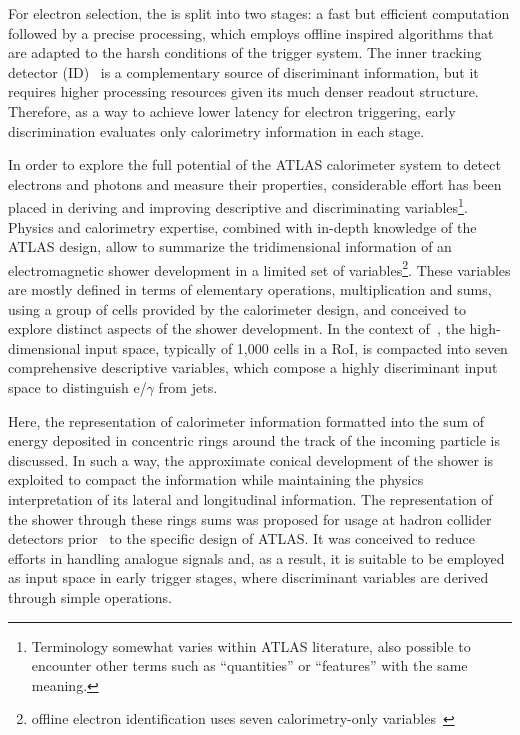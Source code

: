 For electron selection, the \hlt{} is split into two stages: a fast but efficient computation followed by a precise processing, which employs offline inspired algorithms that are adapted to the harsh conditions of the trigger system. The inner tracking detector (ID)~\cite{PERF-2007-01} is a complementary source of discriminant information, but it requires higher processing resources given its much denser readout structure.  Therefore, as a way to achieve lower latency for electron triggering, early discrimination evaluates only calorimetry information in each stage.


In order to explore the full potential of the ATLAS calorimeter system to detect electrons and photons and measure their properties, considerable effort has been placed in deriving and improving descriptive and discriminating variables\footnote{Terminology somewhat varies within ATLAS literature, also possible to encounter other terms such as ``quantities'' or ``features'' with the same meaning.}. Physics and calorimetry expertise,
combined with in-depth knowledge of the ATLAS design, allow to summarize the tridimensional information of an electromagnetic shower development in a limited set of 
variables\footnote{offline electron identification uses seven calorimetry-only
variables~\cite{aaboud2019electron}}. These variables are mostly defined in
terms of elementary operations, multiplication and sums, using a group of cells provided by the calorimeter
design, and conceived to explore distinct aspects of the shower development. In the context of~\cite{aad2020performance}, the high-dimensional input space, typically of 1,000 cells in a RoI, is compacted into seven comprehensive descriptive variables, which compose a highly discriminant input space to distinguish e/$\gamma$ from jets.

Here, the representation of calorimeter information formatted into the sum of energy deposited in concentric rings around the track of the incoming particle is discussed. In such a way, the approximate conical development of the shower is exploited to compact the information while maintaining the physics interpretation of its lateral and longitudinal information. The representation of the shower through these rings sums was proposed for usage at hadron collider detectors prior~\cite{1992_spacal_rings} to the specific design of ATLAS.
It was conceived to reduce efforts in handling analogue signals and, as a result, it is suitable to be employed as input space in early trigger stages, where discriminant variables are derived through simple operations.


